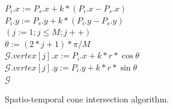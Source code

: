 \begin{figure}[tb!]
\begin{center}
{\begin{minipage}{3.36in}
{	\icc \hspace{1ex} $P_i.x := P_s.x + k*(P_i.x-P_s.x)$ \\
	\icc \hspace{1ex} $P_i.y := P_s.y + k*(P_i.y-P_s.y)$ \\
	\icc \hspace{1ex} \For $(j := 1;j \le M;j++)$ \\
	\icc \> \hspace{3ex} $\theta :=  (2 * j + 1)*\pi /M $ \\
	\icc \> \hspace{3ex} $\mathcal{G}.vertex[j].x := P_i.x + k*r*\cos\theta$\\
	\icc \> \hspace{3ex} $\mathcal{G}.vertex[j].y := P_i.y + k*r*\sin\theta$\\
	\icc \hspace{1ex} \Return $\mathcal{G}$
}
\vspace{-2ex}
\myhrule
\end{minipage}
}
\end{center}
\vspace{-2ex}
\caption{\small Spatio-temporal cone intersection algorithm.}
\label{alg:CI3d}
\vspace{-2ex}
\end{figure}






